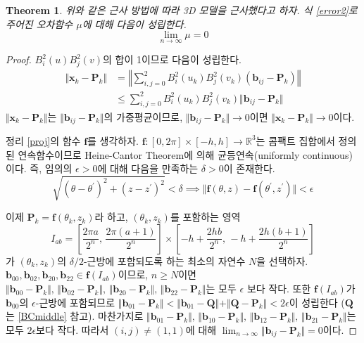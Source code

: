 \documentclass{gshs_thesis}
\theoremstyle{theorem}
\newtheorem{theorem}{Theorem}[section]
\theoremstyle{lemma}
\theoremstyle{definition}
\begin{document}
\begin{theorem} \label{thm2}
	위와 같은 근사 방법에 따라 3D 모델을 근사했다고 하자. 식 \eqref{error2}로 주어진 오차함수 $\mu$에 대해 다음이 성립한다.
	\begin{equation*}
		\lim_{n\to\infty}\mu=0
	\end{equation*}
\end{theorem} 
\begin{proof}
	$B_i^2(u) B_j^2(v)$의 합이 1이므로 다음이 성립한다.
	\begin{align*}
		\Vert \mathbf{x}_k - \mathbf{P}_k \Vert &= \left\Vert \sum_{i, j = 0}^2 B_i^2(u_k) B_j^2(v_k) (\mathbf{b}_{ij} - \mathbf{P}_k) \right\Vert \\
		&\leq \sum_{i, j = 0}^2 B_i^2(u_k) B_j^2(v_k) \Vert \mathbf{b}_{ij} - \mathbf{P}_k \Vert 
	\end{align*}
	$\Vert \mathbf{x}_k - \mathbf{P}_k \Vert$는 $\Vert \mathbf{b}_{ij} - \mathbf{P}_k \Vert$의 가중평균이므로, $\Vert \mathbf{b}_{ij} - \mathbf{P}_k \Vert \to 0$이면 $\Vert \mathbf{x}_k - \mathbf{P}_k \Vert \to 0$이다. 
	
	정리 \ref{proj}의 함수 $\mathbf{f}$를 생각하자. $\mathbf{f} \colon [0, 2\pi] \times [-h, h] \to \mathbb{R}^3$는 콤팩트 집합에서 정의된 연속함수이므로 Heine-Cantor Theorem에 의해 균등연속(uniformly continuous)이다. 즉, 임의의 $\epsilon > 0$에 대해 다음을 만족하는 $\delta > 0$이 존재한다. 
	$$ \sqrt{(\theta - \theta^\prime)^2 + (z - z^\prime)^2} < \delta \implies \Vert \mathbf{f}(\theta, z) - \mathbf{f}(\theta^\prime, z^\prime) \Vert < \epsilon $$
	
	이제 $\mathbf{P}_k = \mathbf{f}(\theta_k, z_k)$라 하고, $(\theta_k, z_k)$를 포함하는 영역 $$ I_{ab} = \left[ \frac{2\pi a}{2^n}, \, \frac{2\pi(a+1)}{2^n}\right] \times \left[ -h + \frac{2hb}{2^n}, \, -h + \frac{2h(b+1)}{2^n} \right] $$가 $(\theta_k, z_k)$의 $\delta/2$-근방에 포함되도록 하는 최소의 자연수 $N$을 선택하자. $\mathbf{b}_{00}, \mathbf{b}_{02}, \mathbf{b}_{20}, \mathbf{b}_{22} \in \mathbf{f}(I_{ab})$이므로, $n \geq N$이면 $\Vert \mathbf{b}_{00} - \mathbf{P}_k \Vert, \, \Vert \mathbf{b}_{02} - \mathbf{P}_k \Vert, \, \Vert \mathbf{b}_{20} - \mathbf{P}_k \Vert, \, \Vert \mathbf{b}_{22} - \mathbf{P}_k \Vert $는 모두 $\epsilon$ 보다 작다. 또한 $\mathbf{f}(I_{ab})$가 $\mathbf{b}_{00}$의 $\epsilon$-근방에 포함되므로 $\Vert \mathbf{b}_{01} - \mathbf{P}_k \Vert < \Vert \mathbf{b}_{01} - \mathbf{Q} \Vert + \Vert \mathbf{Q} - \mathbf{P}_k \Vert < 2\epsilon$이 성립한다 ($\mathbf{Q}$는 \cref{BCmiddle} 참고). 마찬가지로 $\Vert \mathbf{b}_{01} - \mathbf{P}_k \Vert, \, \Vert \mathbf{b}_{10} - \mathbf{P}_k \Vert, \, \Vert \mathbf{b}_{12} - \mathbf{P}_k \Vert, \, \Vert \mathbf{b}_{21} - \mathbf{P}_k \Vert $는 모두 $2\epsilon$보다 작다. 따라서 $(i, j) \neq (1, 1)$에 대해 $\lim_{n \to \infty} \Vert \mathbf{b}_{ij} - \mathbf{P}_k \Vert = 0$이다. 
	

\end{proof}
\end{document}
